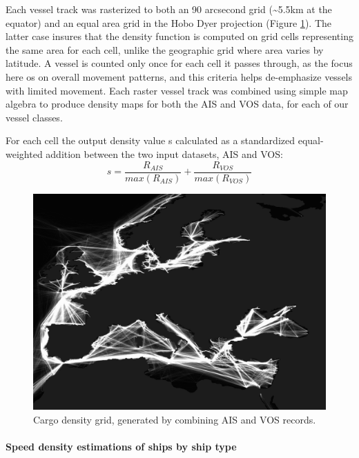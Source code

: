 Each vessel track was rasterized to both an 90 arcsecond grid (\textasciitilde{}5.5km at the equator) and an equal area grid in the Hobo Dyer projection (Figure \ref{fig:eu-cargo-density}). The latter case insures that the density function is computed on grid cells representing the same area for each cell, unlike the geographic grid where area varies by latitude. A vessel is counted only once for each cell it passes through, as the focus here os on overall movement patterns, and this criteria helps de-emphasize vessels with limited movement. Each raster vessel track was combined using simple map algebra to produce density maps for both the AIS and VOS data, for each of our vessel classes.

For each cell the output density value s calculated as a standardized equal-weighted addition between the two input datasets, AIS and VOS:
\begin{equation}
 s = \frac{R_{AIS}}{max(R_{AIS})} + \frac{R_{VOS}}{max(R_{VOS})} 
\end{equation}

\begin{figure}[h!]
  \centering
    \includegraphics[width=120mm]{figures/cargo-lanes-eu-cropped.png}
  \caption {Cargo density grid, generated by combining AIS and VOS records.}
  \label{fig:eu-cargo-density}
\end{figure}


\paragraph{Speed density estimations of ships by ship type}

